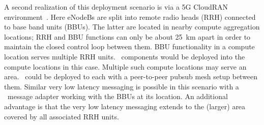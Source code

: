 A second realization of this deployment scenario is via a 5G CloudRAN
environment~\cite{checko2015cloud}. Here eNodeBs are split into remote radio
heads (RRH) connected to base band units (BBUs).  The latter are
located in nearby compute aggregation locations; RRH and BBU functions
can only be about 25~km apart in order to maintain the closed control
loop between them. BBU functionality in a compute location serves
multiple RRH units. \name~components would be deployed into the
compute locations in this case.  Multiple such compute locations may
serve an area. \name~could be deployed to each with a peer-to-peer
pubsub mesh setup between them.  Similar very low latency messaging is
possible in this scenario with a \name~message adapter working with
the BBUs at its location.  An additional advantage is that the very
low latency messaging extends to the (larger) area covered by all
associated RRH units.
